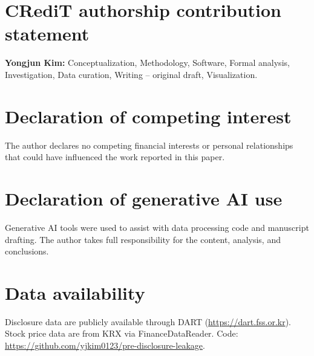 \documentclass[review,authoryear]{elsarticle}
\begin{document}
\section*{CRediT authorship contribution statement}
\textbf{Yongjun Kim:} Conceptualization, Methodology, Software, Formal analysis, Investigation, Data curation, Writing -- original draft, Visualization.

\section*{Declaration of competing interest}
The author declares no competing financial interests or personal relationships that could have influenced the work reported in this paper.

\section*{Declaration of generative AI use}
Generative AI tools were used to assist with data processing code and manuscript drafting. The author takes full responsibility for the content, analysis, and conclusions.

\section*{Data availability}
Disclosure data are publicly available through DART (\url{https://dart.fss.or.kr}). Stock price data are from KRX via FinanceDataReader. Code: \url{https://github.com/yjkim0123/pre-disclosure-leakage}.



\end{document}
